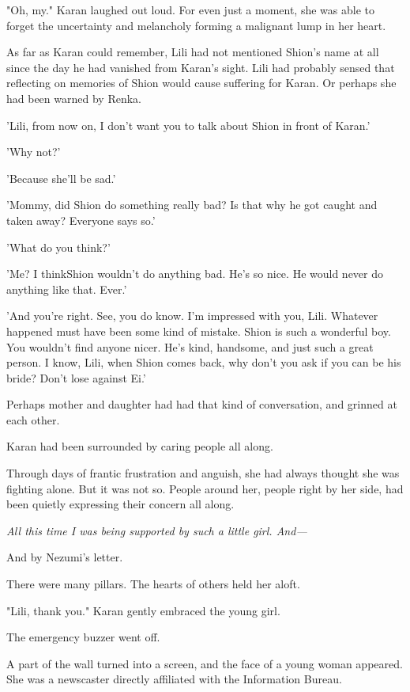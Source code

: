 "Oh, my." Karan laughed out loud. For even just a moment, she was able
to forget the uncertainty and melancholy forming a malignant lump in her
heart.

As far as Karan could remember, Lili had not mentioned Shion's name at
all since the day he had vanished from Karan's sight. Lili had probably
sensed that reflecting on memories of Shion would cause suffering for
Karan. Or perhaps she had been warned by Renka.

'Lili, from now on, I don't want you to talk about Shion in front of
Karan.'

'Why not?'

'Because she'll be sad.'

'Mommy, did Shion do something really bad? Is that why he got caught and
taken away? Everyone says so.'

'What do you think?'

'Me? I think\el Shion wouldn't do anything bad. He's so nice. He would
never do anything like that. Ever.'

'And you're right. See, you do know. I'm impressed with you, Lili.
Whatever happened must have been some kind of mistake. Shion is such a
wonderful boy. You wouldn't find anyone nicer. He's kind, handsome, and
just such a great person. I know, Lili, when Shion comes back, why don't
you ask if you can be his bride? Don't lose against Ei.'

Perhaps mother and daughter had had that kind of conversation, and
grinned at each other.

Karan had been surrounded by caring people all along.

Through days of frantic frustration and anguish, she had always thought
she was fighting alone. But it was not so. People around her, people
right by her side, had been quietly expressing their concern all along.

\emph{All this time I was being supported by such a little girl. And---}


And by Nezumi's letter.

There were many pillars. The hearts of others held her aloft.

"Lili, thank you." Karan gently embraced the young girl.

The emergency buzzer went off.

A part of the wall turned into a screen, and the face of a young woman
appeared. She was a newscaster directly affiliated with the Information
Bureau.

